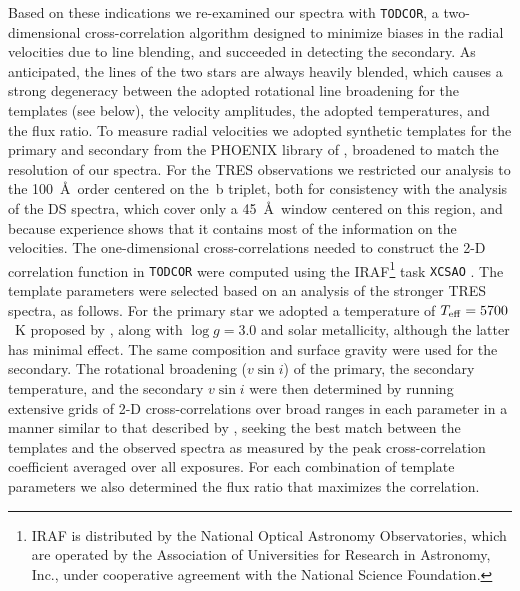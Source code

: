 \documentclass[twocolumn]{aastex61}
\begin{document}
Based on these indications we re-examined our spectra with {\tt TODCOR}, a two-dimensional cross-correlation algorithm designed to minimize biases in the radial velocities due to line blending, and succeeded in detecting the secondary. As anticipated, the lines of the two stars are always heavily blended, which causes a strong degeneracy between the adopted rotational line broadening for the templates (see below), the velocity amplitudes, the adopted temperatures, and the flux ratio. To measure radial velocities we adopted synthetic templates for the primary and secondary from the PHOENIX library of \cite{husser13}, broadened to match the resolution of our spectra. For the TRES observations we restricted our analysis to the 100~\AA\ order centered on the \,b triplet, both for consistency with the analysis of the DS spectra, which cover only a 45~\AA\ window centered on this region, and because experience shows that it contains most of the information on the velocities. The one-dimensional cross-correlations needed to construct the 2-D correlation function in {\tt TODCOR} were computed using the IRAF\footnote{IRAF is distributed by the National Optical Astronomy Observatories, which are operated by the Association of Universities for Research in Astronomy, Inc., under cooperative agreement with the National Science Foundation.} task {\tt XCSAO} \citep{kurtz98}. The template parameters were selected based on an analysis of the stronger TRES spectra, as follows. For the primary star we adopted a temperature of $T_{\rm eff} = 5700$~K proposed by \cite{mathieu91}, along with $\log g = 3.0$ and solar metallicity, although the latter has minimal effect. The same composition and surface gravity were used for the secondary.
The rotational broadening ($v \sin i$) of the primary, the secondary temperature, and the secondary $v \sin i$ were then determined by running extensive grids of 2-D cross-correlations over broad ranges in each parameter in a manner similar to that described by \cite{torres02}, seeking the best match between the templates and the observed spectra as measured by the peak cross-correlation coefficient averaged over all exposures. For each combination of template parameters we also determined the flux ratio that maximizes the correlation.
\end{document}
